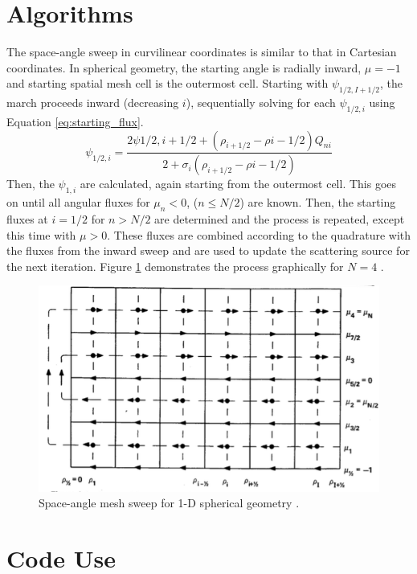 \documentclass[11pt, oneside]{article}   	%
\begin{document}
\section{Algorithms}

The space-angle sweep in curvilinear coordinates is similar to that in Cartesian coordinates. In spherical geometry, the starting angle is radially inward, $\mu = -1$ and starting spatial mesh cell is the outermost cell. Starting with $\psi_{1/2, I+1/2}$, the march proceeds inward (decreasing $i$), sequentially solving for each $\psi_{1/2, i}$ using Equation \ref{eq:starting_flux}. 
%
\begin{equation}\label{eq:starting_flux}
\psi_{1/2, i} = \frac{2\psi{1/2, i+1/2}+\left(\rho_{i+1/2} - \rho{i-1/2}\right)Q_{ni}}{2+\sigma_i\left(\rho_{i+1/2} - \rho{i-1/2}\right)}
\end{equation}
%
Then, the $\psi_{1,i}$ are calculated, again starting from the outermost cell. This goes on until all angular fluxes for $\mu_n<0$, ($n \leq N/2$) are known. Then, the starting fluxes at $i=1/2$ for $n > N/2$ are determined and the process is repeated, except this time with $\mu > 0$. These fluxes are combined according to the quadrature with the fluxes from the inward sweep and are used to update the scattering source for the next iteration. Figure \ref{fig:algorithm} demonstrates the process graphically for $N=4$ \cite{lm}.
%
\begin{figure}\label{fig:algorithm}
\includegraphics[width=14cm]{algorithm}
\caption{Space-angle mesh sweep for 1-D spherical geometry \cite{lm}.}
\end{figure}

\section{Code Use}
\end{document}
